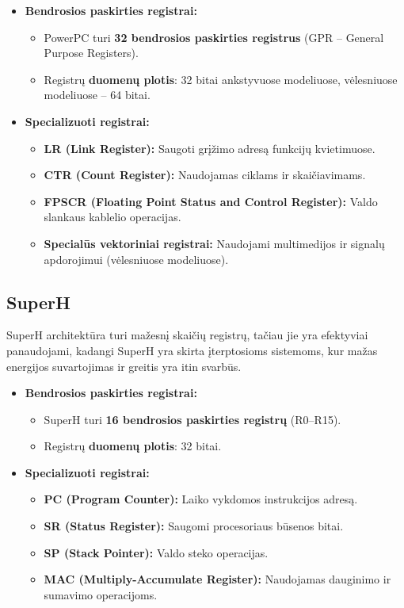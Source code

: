 \documentclass{article}
\begin{document}
\begin{itemize}
    \item \textbf{Bendrosios paskirties registrai:} 
        \begin{itemize}
            \item PowerPC turi \textbf{32 bendrosios paskirties registrus} (GPR – General Purpose Registers).
            \item Registrų \textbf{duomenų plotis}: 32 bitai ankstyvuose modeliuose, vėlesniuose modeliuose – 64 bitai.
        \end{itemize}
    \item \textbf{Specializuoti registrai:}
        \begin{itemize}
            \item \textbf{LR (Link Register):} Saugoti grįžimo adresą funkcijų kvietimuose.
            \item \textbf{CTR (Count Register):} Naudojamas ciklams ir skaičiavimams.
            \item \textbf{FPSCR (Floating Point Status and Control Register):} Valdo slankaus kablelio operacijas.
            \item \textbf{Specialūs vektoriniai registrai:} Naudojami multimedijos ir signalų apdorojimui (vėlesniuose modeliuose).
        \end{itemize}
\end{itemize}

\subsection{SuperH}
SuperH architektūra turi mažesnį skaičių registrų, tačiau jie yra efektyviai panaudojami, kadangi SuperH yra skirta įterptosioms sistemoms, kur mažas energijos suvartojimas ir greitis yra itin svarbūs.

\begin{itemize}
    \item \textbf{Bendrosios paskirties registrai:}
        \begin{itemize}
            \item SuperH turi \textbf{16 bendrosios paskirties registrų} (R0–R15).
            \item Registrų \textbf{duomenų plotis}: 32 bitai.
        \end{itemize}
    \item \textbf{Specializuoti registrai:}
        \begin{itemize}
            \item \textbf{PC (Program Counter):} Laiko vykdomos instrukcijos adresą.
            \item \textbf{SR (Status Register):} Saugomi procesoriaus būsenos bitai.
            \item \textbf{SP (Stack Pointer):} Valdo steko operacijas.
            \item \textbf{MAC (Multiply-Accumulate Register):} Naudojamas dauginimo ir sumavimo operacijoms.
        \end{itemize}
\end{itemize}
\end{document}
